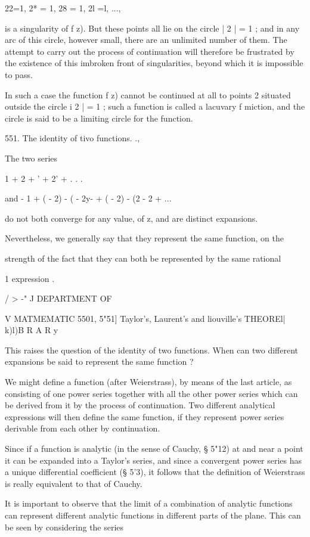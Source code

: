 {{22=1, 2* = 1, 28 = 1, 2l =l, ...,

is a singularity of f z). But these points all lie on the circle | 2 |
= 1 ; and in any arc of this circle, however small, there are an
unlimited number of them. The attempt to carry out the process of
continuation will therefore be frustrated by the existence of this
imbroken front of singularities, beyond which it is impossible to
pass.

In such a case the function f z) cannot be continued at all to points
2 situated outside the circle i 2 | = 1 ; such a function is called a
lacuvary f miction, and the circle is said to be a limiting circle for
the function.

551. The identity of tivo functions. .,

The two series

1 + 2 + ' + 2' + . . .

and - 1 + ( - 2) - ( - 2y- + ( - 2) - (2 - 2 + ...

do not both converge for any value, of z, and are distinct expansions.

Nevertheless, we generally say that they represent the same function,
on the

strength of the fact that they can both be represented by the same
rational

1 expression .



/ > -" J DEPARTMENT OF

V MATMEMATIC 5501, 5"51] Taylor's, Laurent's and liouville's THEOREl|
k)l)B R A R y

This raises the question of the identity of two functions. When can
two different expansions be said to represent the same function ?

We might define a function (after Weierstrass), by means of the last
article, as consisting of one power series together with all the other
power series which can be derived from it by the process of
continuation. Two different analytical expressions will then define
the same function, if they represent power series derivable from each
other by continuation.

Since if a function is analytic (in the sense of Cauchy, § 5"12) at
and near a point it can be expanded into a Taylor's series, and since
a convergent power series has a unique differential coefficient (§
5'3), it follows that the definition of Weierstrass is really
equivalent to that of Cauchy.

It is important to observe that the limit of a combination of analytic
functions can represent different analytic functions in different
parts of the plane. This can be seen by considering the series



}}
